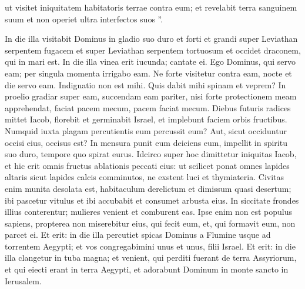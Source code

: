 \begin{biblechapter}
\begin{biblechapter}
\begin{biblechapter}
\begin{biblechapter}
\begin{biblechapter}
\begin{biblechapter}
\begin{biblechapter}
\begin{biblechapter}
\begin{biblechapter}
\begin{biblechapter}
\begin{biblechapter}
\begin{biblechapter}
\begin{biblechapter}
\begin{biblechapter}
\begin{biblechapter}
\begin{biblechapter}
\begin{biblechapter}
\begin{biblechapter}
\begin{biblechapter}
\begin{biblechapter}
\begin{biblechapter}
\begin{biblechapter}
\begin{biblechapter}
\begin{biblechapter}
\begin{biblechapter}
\begin{biblechapter}
 ut visitet iniquitatem habitatoris terrae contra eum;
 et revelabit terra sanguinem suum
 et non operiet ultra interfectos suos ”.
 
\begin{biblechapter}
\verse In die illa visitabit Dominus
 in gladio suo duro et forti et grandi
 super Leviathan serpentem fugacem
 et super Leviathan serpentem tortuosum
 et occidet draconem, qui in mari est.
 \verse In die illa vinea erit iucunda;
 cantate ei.
 \verse Ego Dominus, qui servo eam;
 per singula momenta irrigabo eam.
 Ne forte visitetur contra eam,
 nocte et die servo eam.
 \verse Indignatio non est mihi.
 Quis dabit mihi spinam et veprem?
 In proelio gradiar super eam,
 succendam eam pariter,
 \verse nisi forte protectionem meam apprehendat,
 faciat pacem mecum,
 pacem faciat mecum.
 \verse Diebus futuris radices mittet Iacob,
 florebit et germinabit Israel,
 et implebunt faciem orbis fructibus.
 \verse Numquid iuxta plagam percutientis eum percussit eum?
 Aut, sicut occiduntur occisi eius, occisus est?
 \verse In mensura punit eum deiciens eum,
 impellit in spiritu suo duro, tempore quo spirat eurus.
 \verse Idcirco super hoc dimittetur iniquitas Iacob,
 et hic erit omnis fructus ablationis peccati eius:
 ut scilicet ponat omnes lapides altaris
 sicut lapides calcis comminutos,
 ne exstent luci et thymiateria.
 \verse Civitas enim munita desolata est,
 habitaculum derelictum et dimissum quasi desertum;
 ibi pascetur vitulus et ibi accubabit
 et consumet arbusta eius.
 \verse In siccitate frondes illius conterentur;
 mulieres venient et comburent eas.
 Ipse enim non est populus sapiens,
 propterea non miserebitur eius, qui fecit eum,
 et, qui formavit eum, non parcet ei.
 \verse Et erit: in die illa percutiet spicas Dominus
 a Flumine usque ad torrentem Aegypti;
 et vos congregabimini
 unus et unus, filii Israel.
 \verse Et erit: in die illa clangetur in tuba magna;
 et venient, qui perditi fuerant de terra Assyriorum,
 et qui eiecti erant in terra Aegypti,
 et adorabunt Dominum
 in monte sancto in Ierusalem.
 

\end{biblechapter}
\end{biblechapter}
\end{biblechapter}
\end{biblechapter}
\end{biblechapter}
\end{biblechapter}
\end{biblechapter}
\end{biblechapter}
\end{biblechapter}
\end{biblechapter}
\end{biblechapter}
\end{biblechapter}
\end{biblechapter}
\end{biblechapter}
\end{biblechapter}
\end{biblechapter}
\end{biblechapter}
\end{biblechapter}
\end{biblechapter}
\end{biblechapter}
\end{biblechapter}
\end{biblechapter}
\end{biblechapter}
\end{biblechapter}
\end{biblechapter}
\end{biblechapter}
\end{biblechapter}
